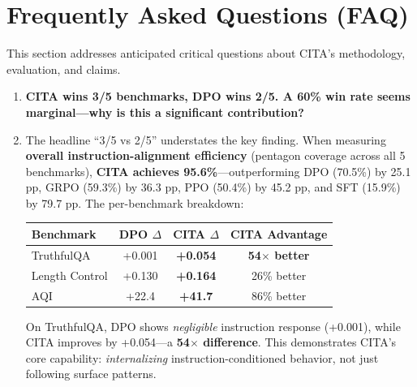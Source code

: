 
\onecolumn
\vspace{-2mm}
\section{Frequently Asked Questions (FAQ)}
\label{sec:faq}

This section addresses anticipated critical questions about CITA's methodology, evaluation, and claims.

\vspace{4mm}

\begin{enumerate}[label=\textbf{Q\arabic*.}, leftmargin=*, itemsep=8pt]

\item[\ding{93}] \textbf{CITA wins 3/5 benchmarks, DPO wins 2/5. A 60\% win rate seems marginal---why is this a significant contribution?}

\item[\ding{224}] The headline ``3/5 vs 2/5'' understates the key finding. When measuring \textbf{overall instruction-alignment efficiency} (pentagon coverage across all 5 benchmarks), \textbf{CITA achieves 95.6\%}---outperforming DPO (70.5\%) by 25.1 pp, GRPO (59.3\%) by 36.3 pp, PPO (50.4\%) by 45.2 pp, and SFT (15.9\%) by 79.7 pp. The per-benchmark breakdown:

\begin{table}[H]
\centering
\small
\begin{tabular}{@{}lccc@{}}
\toprule
\textbf{Benchmark} & \textbf{DPO $\Delta$} & \textbf{CITA $\Delta$} & \textbf{CITA Advantage} \\
\midrule
TruthfulQA & +0.001 & \textbf{+0.054} & \textbf{54$\times$ better} \\
\hline
Length Control & +0.130 & \textbf{+0.164} & 26\% better \\
\hline
AQI & +22.4 & \textbf{+41.7} & 86\% better \\
\bottomrule
\end{tabular}
\end{table}

On TruthfulQA, DPO shows \textit{negligible} instruction response (+0.001), while CITA improves by +0.054---a \textbf{54$\times$ difference}. This demonstrates CITA's core capability: \textit{internalizing} instruction-conditioned behavior, not just following surface patterns.


\end{enumerate}
